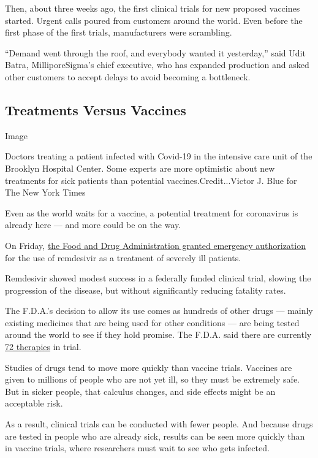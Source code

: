 Then, about three weeks ago, the first clinical trials for new proposed
vaccines started. Urgent calls poured from customers around the world.
Even before the first phase of the first trials, manufacturers were
scrambling.

``Demand went through the roof, and everybody wanted it yesterday,''
said Udit Batra, MilliporeSigma's chief executive, who has expanded
production and asked other customers to accept delays to avoid becoming
a bottleneck.

\hypertarget{treatments-versus-vaccines}{%
\subsection{Treatments Versus
Vaccines}\label{treatments-versus-vaccines}}

Image

Doctors treating a patient infected with Covid-19 in the intensive care
unit of the Brooklyn Hospital Center. Some experts are more optimistic
about new treatments for sick patients than potential
vaccines.Credit...Victor J. Blue for The New York Times

Even as the world waits for a vaccine, a potential treatment for
coronavirus is already here --- and more could be on the way.

On Friday,
\href{https://www.nytimes3xbfgragh.onion/2020/05/01/health/coronavirus-remdesivir.html}{the
Food and Drug Administration granted emergency authorization} for the
use of remdesivir as a treatment of severely ill patients.

Remdesivir showed modest success in a federally funded clinical trial,
slowing the progression of the disease, but without significantly
reducing fatality rates.

The F.D.A.'s decision to allow its use comes as hundreds of other drugs
--- mainly existing medicines that are being used for other conditions
--- are being tested around the world to see if they hold promise. The
F.D.A. said there are currently
\href{https://www.fda.gov/drugs/coronavirus-covid-19-drugs/coronavirus-treatment-acceleration-program-ctap}{72
therapies} in trial.

Studies of drugs tend to move more quickly than vaccine trials. Vaccines
are given to millions of people who are not yet ill, so they must be
extremely safe. But in sicker people, that calculus changes, and side
effects might be an acceptable risk.

As a result, clinical trials can be conducted with fewer people. And
because drugs are tested in people who are already sick, results can be
seen more quickly than in vaccine trials, where researchers must wait to
see who gets infected.

